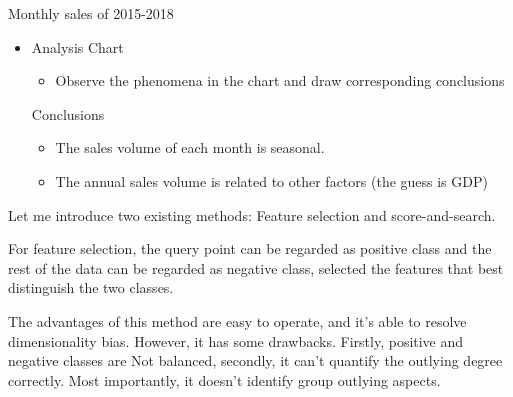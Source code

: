 \documentclass[
 size=14pt,
 paper=smartboard,  %
 mode=present, 		%
 display=slides, 	%
 style=tuliplab,  	%
 pauseslide,
 fleqn,leqno]{powerdot}
\begin{document}
\begin{slide}{Monthly sales of 2015-2018}
\begin{itemize}
\item
Analysis Chart

\begin{itemize}
\item
Observe the phenomena in the chart and draw corresponding conclusions
\end{itemize}
\vspace{1cm}
{
Conclusions
\begin{itemize}
\item
\smallskip
The sales volume of each month is seasonal.

\item
\smallskip
The annual sales volume is related to other factors (the guess is GDP)
\end{itemize}
}
\end{itemize}

\begin{note}
Let me introduce two existing methods:
Feature selection and score-and-search.

For feature selection,
the query point can be regarded as positive class and
the rest of the data can be regarded as negative class,
selected the features that best distinguish the two classes.

The advantages of this method are easy to operate,
and it's able to resolve dimensionality bias.
However, it has some drawbacks.
Firstly,
positive and negative classes are Not balanced,
secondly,
it can't quantify the outlying degree correctly.
Most importantly,
it doesn't identify group outlying aspects.
\end{note}

\end{slide}
\end{document}
